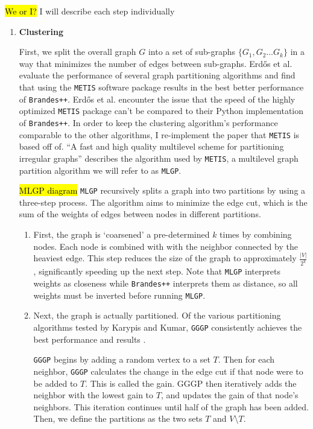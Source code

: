 \documentclass[a4paper,12pt]{article}
\begin{document}
\hl{We or I?}
I will describe each step individually
\begin{enumerate}[label = \textbf{\arabic*.}]
\item \textbf{Clustering}

First, we split the overall graph $G$ into a set of sub-graphs $\{G_1,G_2 \ldots G_k\}$ in a way that minimizes the number of edges between sub-graphs. Erd\H{o}s et al. evaluate the performance of several graph partitioning algorithms and find that using the \texttt{METIS} software package results in the best better performance of \texttt{Brandes++}. Erd\H{o}s et al. encounter the issue that the speed of the highly optimized \texttt{METIS} package can't be compared to their Python implementation of \texttt{Brandes++}. In order to keep the clustering algorithm's performance comparable to the other algorithms, I re-implement the paper that \texttt{METIS} is based off of. ``A fast and high quality multilevel scheme for partitioning irregular graphs''\cite{mlgp} describes the algorithm used by \texttt{METIS}, a multilevel graph partition algorithm we will refer to as \texttt{MLGP}.

\hl{MLGP diagram}
\texttt{MLGP} recursively splits a graph into two partitions by using a three-step process. The algorithm aims to minimize the edge cut, which is the sum of the weights of edges between nodes in different partitions. 
\begin{enumerate}[label = \arabic*.]
\item First, the graph is `coarsened' a pre-determined $k$ times by combining nodes. Each node is combined with with the neighbor connected by the heaviest edge. This step reduces the size of the graph to approximately $\frac{|V|}{2^k}$, significantly speeding up the next step. Note that \texttt{MLGP} interprets weights as closeness while \texttt{Brandes++} interprets them as distance, so all weights must be inverted before running \texttt{MLGP}.

\item Next, the graph is actually partitioned. Of the various partitioning algorithms tested by Karypis and Kumar, \texttt{GGGP} consistently achieves the best performance and results \cite{mlgp}. 

\texttt{GGGP} begins by adding a random vertex to a set $T$. Then for each neighbor, \texttt{GGGP} calculates the change in the edge cut if that node were to be added to $T$. This is called the gain. GGGP then iteratively adds the neighbor with the lowest gain to $T$, and updates the gain of that node's neighbors. This iteration continues until half of the graph has been added. Then, we define the partitions as the two sets $T$ and $V \setminus T$.


\end{enumerate}
\end{enumerate}
\end{document}
